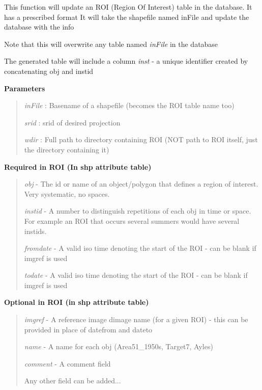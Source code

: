 \documentclass[letterpaper,10pt,openany,oneside]{sphinxmanual}
\begin{document}
\begin{fulllineitems}
\begin{fulllineitems}
\end{fulllineitems}


\begin{fulllineitems}
\label{code:Database.Database.updateROI}
This function will update an ROI (Region Of Interest) table in the database. It has a prescribed format
It will take the shapefile named inFile and update the database with the info

Note that this will overwrite any table named \emph{inFile} in the database

The generated table will include a column \emph{inst} - a unique identifier created by 
concatenating obj and instid

\textbf{Parameters}
\begin{quote}

\emph{inFile}   : Basename of a shapefile (becomes the ROI table name too)

\emph{srid}     : srid of desired projection

\emph{wdir}     : Full path to directory containing ROI (NOT path to ROI itself, just the directory containing it)
\end{quote}

\textbf{Required in ROI (In shp attribute table)}
\begin{quote}

\emph{obj}      - The id or name of an object/polygon that defines a region of interest. Very systematic, no spaces.

\emph{instid}   - A number to distinguish repetitions of each obj in time or space.  For example an ROI that occurs several summers would have several instids.

\emph{fromdate} - A valid iso time denoting the start of the ROI - can be blank if imgref is used

\emph{todate}   - A valid iso time denoting the start of the ROI - can be blank if imgref is used
\end{quote}

\textbf{Optional in ROI (in shp attribute table)}
\begin{quote}

\emph{imgref}   - A reference image dimage name (for a given ROI) - this can be provided in place of datefrom and dateto

\emph{name}     - A name for each obj (Area51\_1950s, Target7, Ayles)

\emph{comment}  - A comment field

Any other field can be added...
\end{quote}

\end{fulllineitems}


\end{fulllineitems}
\end{document}
